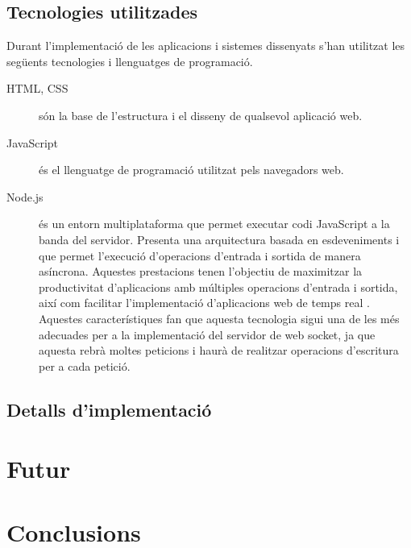 \documentclass[12pt,a4paper,catalan]{article}
\begin{document}
	\subsection{Tecnologies utilitzades}
	Durant l’implementació de les aplicacions i sistemes dissenyats s’han utilitzat les següents tecnologies i llenguatges de programació.
	\begin{description}
		\item[HTML, CSS] són la base de l’estructura i el disseny de qualsevol aplicació web.
		\item[JavaScript] és el llenguatge de programació utilitzat pels navegadors web.
		\item[Node.js] és un entorn multiplataforma que permet executar codi JavaScript a la banda del servidor. Presenta una arquitectura basada en esdeveniments i que permet l’execució d’operacions d’entrada i sortida de manera asíncrona. Aquestes prestacions tenen l’objectiu de maximitzar la productivitat d’aplicacions amb múltiples operacions d’entrada i sortida, així com facilitar l’implementació d’aplicacions web de temps real \cite{nodejs}.\\
		Aquestes característiques fan que aquesta tecnologia sigui una de les més adecuades per a la implementació del servidor de web socket, ja que aquesta rebrà moltes peticions i haurà de realitzar operacions d’escritura per a cada petició.
	\end{description}
	\subsection{Detalls d'implementació}
	\section{Futur}
	\section{Conclusions}
	\printbibliography[heading=bibnumbered,title={Bibliografia}]
\end{document}
